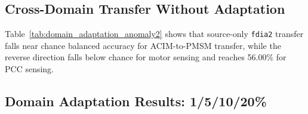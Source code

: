 \documentclass[letterpaper,journal]{IEEEtran}
\begin{document}
\subsection{Cross-Domain Transfer Without Adaptation}
\label{sec:cross_domain}

Table~\ref{tab:domain_adaptation_anomaly2} shows that source-only \texttt{fdia2} transfer falls near chance balanced accuracy for ACIM-to-PMSM transfer, while the reverse direction falls below chance for motor sensing and reaches 56.00\% for PCC sensing.



\subsection{Domain Adaptation Results: 1/5/10/20\%}
\label{sec:adaptation_results}
\end{document}
